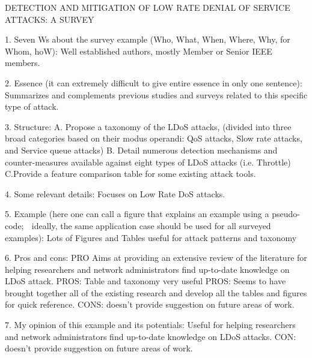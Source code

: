 DETECTION AND MITIGATION OF LOW RATE DENIAL OF SERVICE ATTACKS: A SURVEY

1. Seven Ws about the survey example (Who, What, When, Where, Why, for Whom, hoW): Well established authors, mostly Member or Senior IEEE members.

2. Essence (it can extremely difficult to give entire essence in only one sentence): Summarizes and complements previous studies and surveys related to this specific type of attack.

3. Structure:
A. Propose a taxonomy of the LDoS attacks, (divided into three
broad categories based on their modus operandi: QoS attacks, Slow rate attacks, and Service queue attacks)
B. Detail numerous detection mechanisms and counter-measures available against eight types of LDoS
attacks (i.e. Throttle)
C.Provide a feature comparison table for some existing attack tools. 

4. Some relevant details: Focuses on Low Rate DoS attacks.

5. Example (here one can call a figure that explains an example using a pseudo-code;  ideally, the same application case should be used for all surveyed examples): Lots of Figures and Tables useful for attack patterns and taxonomy

6. Pros and cons:
PRO Aims at providing an extensive review of the literature for helping researchers and network administrators find up-to-date knowledge on LDoS attack.
PROS: Table and taxonomy very useful
PROS: Seems to have brought together all of the existing research and develop all the tables and figures for quick reference.
CONS: doesn't provide suggestion on future areas of work.

7. My opinion of this example and its potentials: Useful for helping researchers and network administrators find up-to-date knowledge on LDoS attacks. 
CON: doesn't provide suggestion on future areas of work.